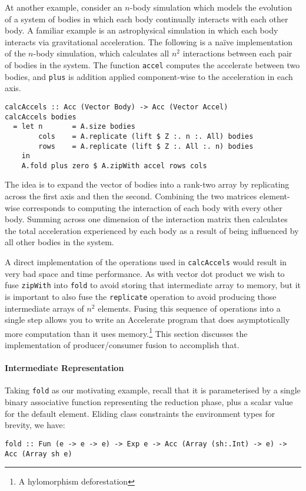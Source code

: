 At another example, consider an $n$-body simulation which models the evolution
of a system of bodies in which each body continually interacts with each other
body. A familiar example is an astrophysical simulation in which each body
interacts via gravitational acceleration. The following is a na\"ive
implementation of the $n$-body simulation, which calculates all $n^{2}$
interactions between each pair of bodies in the system. The function
\texttt{accel} computes the accelerate between two bodies, and \texttt{plus} is
addition applied component-wise to the acceleration in each axis.
%
\begin{lstlisting}[style=haskell]
calcAccels :: Acc (Vector Body) -> Acc (Vector Accel)
calcAccels bodies
  = let n       = A.size bodies
        cols    = A.replicate (lift $ Z :. n :. All) bodies
        rows    = A.replicate (lift $ Z :. All :. n) bodies
    in
    A.fold plus zero $ A.zipWith accel rows cols
\end{lstlisting}
%
The idea is to expand the vector of bodies into a rank-two array by replicating
across the first axis and then the second. Combining the two matrices
element-wise corresponds to computing the interaction of each body with every
other body. Summing across one dimension of the interaction matrix then
calculates the total acceleration experienced by each body as a result of being
influenced by all other bodies in the system.

A direct implementation of the operations used in \texttt{calcAccels} would
result in very bad space and time performance. As with vector dot product we
wish to fuse \texttt{zipWith} into \texttt{fold} to avoid storing that
intermediate array to memory, but it is important to also fuse the
\texttt{replicate} operation to avoid producing those intermediate arrays of
$n^2$ elements. Fusing this sequence of operations into a single step allows you
to write an Accelerate program that does asymptotically more computation than it
uses memory.\footnote{A hylomorphism deforestation} This section discusses the
implementation of producer/consumer fusion to accomplish that.


\paragraph{Intermediate Representation}

%
Taking \texttt{fold} as our motivating example, recall that it is parameterised
by a single binary associative function representing the reduction phase, plus a
scalar value for the default element. Eliding class constraints the environment
types for brevity, we have:
%
\begin{lstlisting}[style=haskell,numbers=none]
fold :: Fun (e -> e -> e) -> Exp e -> Acc (Array (sh:.Int) -> e) -> Acc (Array sh e)
\end{lstlisting}

